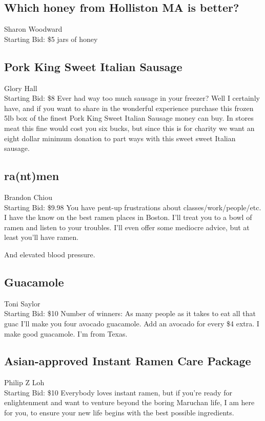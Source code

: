 \documentclass[11pt]{article}
\begin{document}
\subsection{Which honey from Holliston MA is better?}
Sharon Woodward
\\
Starting Bid: \$5
 jars of honey
\subsection{Pork King Sweet Italian Sausage}
Glory Hall
\\
Starting Bid: \$8
\newline
Ever had way too much sausage in your freezer? Well I certainly have, and if you want to share in the wonderful experience purchase this frozen 5lb box of the finest Pork King Sweet Italian Sausage money can buy. In stores meat this fine would cost you six bucks, but since this is for charity we want an eight dollar minimum donation to part ways with this sweet sweet Italian sausage.
\subsection{ra(nt)men}
Brandon Chiou
\\
Starting Bid: \$9.98
\newline
You have pent-up frustrations about classes/work/people/etc. I have the know on the best ramen places in Boston. I'll treat you to a bowl of ramen and listen to your troubles. I'll even offer some mediocre advice, but at least you'll have ramen.

And elevated blood pressure.
\subsection{Guacamole}
Toni Saylor
\\
Starting Bid: \$10
\newline
Number of winners: As many people as it takes to eat all that guac
\newline
I'll make you four avocado guacamole. Add an avocado for every \$4 extra. I make good guacamole. I'm from Texas.
\subsection{Asian-approved Instant Ramen Care Package}
Philip Z Loh
\\
Starting Bid: \$10
\newline
Everybody loves instant ramen, but if you're ready for enlightenment and want to venture beyond the boring Maruchan life, I am here for you, to ensure your new life begins with the best possible ingredients.
\end{document}
